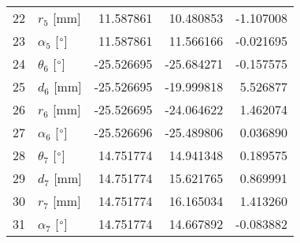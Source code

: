 \documentclass{standalone}%
\begin{document}
\begin{tabular}{llrrr}
22 &              $r_{5}$ [mm] &  11.587861 &  10.480853 &  -1.107008 \\
23 &  $\alpha_{5}$ [$\degree$] &  11.587861 &  11.566166 &  -0.021695 \\
24 &  $\theta_{6}$ [$\degree$] & -25.526695 & -25.684271 &  -0.157575 \\
25 &              $d_{6}$ [mm] & -25.526695 & -19.999818 &   5.526877 \\
26 &              $r_{6}$ [mm] & -25.526695 & -24.064622 &   1.462074 \\
27 &  $\alpha_{6}$ [$\degree$] & -25.526696 & -25.489806 &   0.036890 \\
28 &  $\theta_{7}$ [$\degree$] &  14.751774 &  14.941348 &   0.189575 \\
29 &              $d_{7}$ [mm] &  14.751774 &  15.621765 &   0.869991 \\
30 &              $r_{7}$ [mm] &  14.751774 &  16.165034 &   1.413260 \\
31 &  $\alpha_{7}$ [$\degree$] &  14.751774 &  14.667892 &  -0.083882 \\
\bottomrule
\end{tabular}
%
\end{document}

